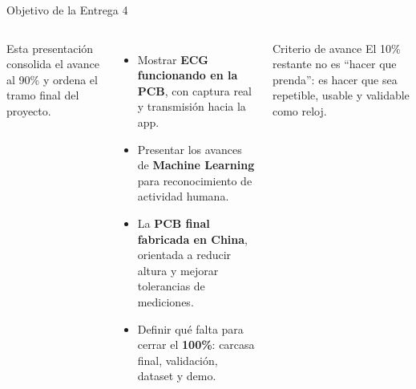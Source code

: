 \documentclass[aspectratio=169, 10pt]{beamer}
\begin{document}
\begin{frame}{Objetivo de la Entrega 4}
    \begin{columns}[T]
        \footnotesize
        Esta presentaci\'on consolida el avance al 90\% y ordena el tramo final del proyecto.
        \vspace{0.25cm}
        \begin{itemize}\itemsep0.14cm
            \item Mostrar \textbf{ECG funcionando en la PCB}, con captura real y transmisi\'on hacia la app.
            \item Presentar los avances de \textbf{Machine Learning} para reconocimiento de actividad humana.
            \item La \textbf{PCB final fabricada en China}, orientada a reducir altura y mejorar tolerancias de mediciones.
            \item Definir qu\'e falta para cerrar el \textbf{100\%}: carcasa final, validaci\'on, dataset y demo.
        \end{itemize}
        \centering
        \vspace{0.25cm}
        \begin{alertblock}{Criterio de avance}
            \scriptsize El 10\% restante no es ``hacer que prenda'': es hacer que sea repetible, usable y validable como reloj.
        \end{alertblock}
    \end{columns}
\end{frame}
\end{document}

